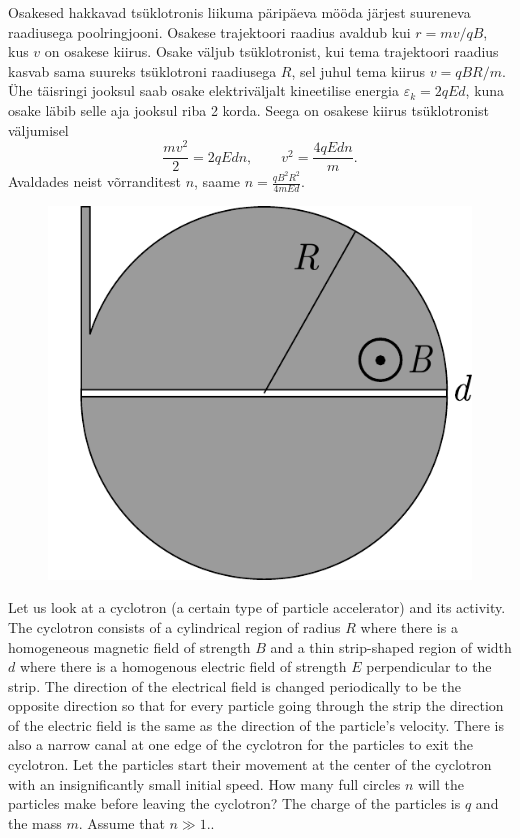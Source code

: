 {\ifSolution
Osakesed hakkavad tsüklotronis liikuma päripäeva mööda järjest suureneva raadiusega poolringjooni. Osakese trajektoori raadius avaldub kui $r=mv/qB$, kus $v$ on osakese kiirus. Osake väljub tsüklotronist, kui tema trajektoori raadius kasvab sama suureks tsüklotroni raadiusega $R$, sel juhul tema kiirus $v=qBR/m$. Ühe täisringi jooksul saab osake elektriväljalt kineetilise energia $\varepsilon_k=2qEd$, kuna osake läbib selle aja jooksul riba 2 korda. Seega on osakese kiirus tsüklotronist väljumisel
\[\frac{mv^2}{2}=2qEdn, \qquad v^2=\frac{4qEdn}{m}.\]
Avaldades neist võrranditest $n$, saame $\displaystyle n=\frac{qB^2R^2}{4mEd}$.
\fi


\ifEngStatement
\begin{figure}
	\begin{center}
		\includegraphics[width=\linewidth]{2018-v2g-10-tsyklotron}
	\end{center}
\end{figure}
Let us look at a cyclotron (a certain type of particle accelerator) and its activity. The cyclotron consists of a cylindrical region of radius $R$ where there is a homogeneous magnetic field of strength $B$ and a thin strip-shaped region of width $d$ where there is a homogenous electric field of strength $E$ perpendicular to the strip. The direction of the electrical field is changed periodically to be the opposite direction so that for every particle going through the strip the direction of the electric field is the same as the direction of the particle’s velocity. There is also a narrow canal at one edge of the cyclotron for the particles to exit the cyclotron. Let the particles start their movement at the center of the cyclotron with an insignificantly small initial speed. How many full circles $n$ will the particles make before leaving the cyclotron? The charge of the particles is $q$ and the mass $m$. Assume that $n\gg 1.$.
\fi


}
